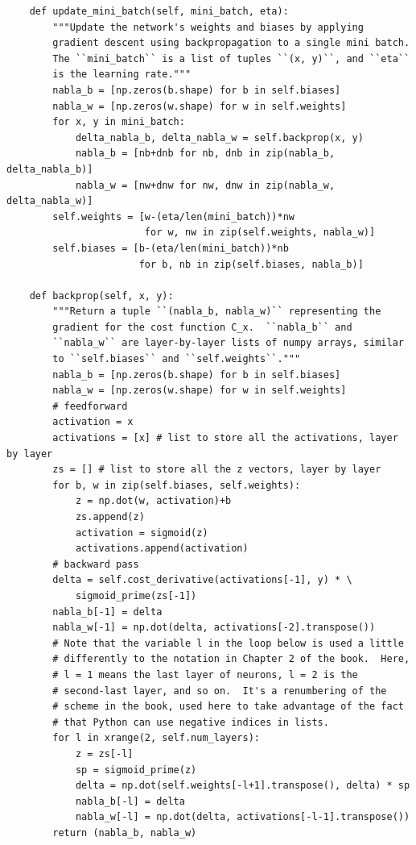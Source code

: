 \begin{verbatim}
    def update_mini_batch(self, mini_batch, eta):
        """Update the network's weights and biases by applying
        gradient descent using backpropagation to a single mini batch.
        The ``mini_batch`` is a list of tuples ``(x, y)``, and ``eta``
        is the learning rate."""
        nabla_b = [np.zeros(b.shape) for b in self.biases]
        nabla_w = [np.zeros(w.shape) for w in self.weights]
        for x, y in mini_batch:
            delta_nabla_b, delta_nabla_w = self.backprop(x, y)
            nabla_b = [nb+dnb for nb, dnb in zip(nabla_b, delta_nabla_b)]
            nabla_w = [nw+dnw for nw, dnw in zip(nabla_w, delta_nabla_w)]
        self.weights = [w-(eta/len(mini_batch))*nw
                        for w, nw in zip(self.weights, nabla_w)]
        self.biases = [b-(eta/len(mini_batch))*nb
                       for b, nb in zip(self.biases, nabla_b)]

    def backprop(self, x, y):
        """Return a tuple ``(nabla_b, nabla_w)`` representing the
        gradient for the cost function C_x.  ``nabla_b`` and
        ``nabla_w`` are layer-by-layer lists of numpy arrays, similar
        to ``self.biases`` and ``self.weights``."""
        nabla_b = [np.zeros(b.shape) for b in self.biases]
        nabla_w = [np.zeros(w.shape) for w in self.weights]
        # feedforward
        activation = x
        activations = [x] # list to store all the activations, layer by layer
        zs = [] # list to store all the z vectors, layer by layer
        for b, w in zip(self.biases, self.weights):
            z = np.dot(w, activation)+b
            zs.append(z)
            activation = sigmoid(z)
            activations.append(activation)
        # backward pass
        delta = self.cost_derivative(activations[-1], y) * \
            sigmoid_prime(zs[-1])
        nabla_b[-1] = delta
        nabla_w[-1] = np.dot(delta, activations[-2].transpose())
        # Note that the variable l in the loop below is used a little
        # differently to the notation in Chapter 2 of the book.  Here,
        # l = 1 means the last layer of neurons, l = 2 is the
        # second-last layer, and so on.  It's a renumbering of the
        # scheme in the book, used here to take advantage of the fact
        # that Python can use negative indices in lists.
        for l in xrange(2, self.num_layers):
            z = zs[-l]
            sp = sigmoid_prime(z)
            delta = np.dot(self.weights[-l+1].transpose(), delta) * sp
            nabla_b[-l] = delta
            nabla_w[-l] = np.dot(delta, activations[-l-1].transpose())
        return (nabla_b, nabla_w)


\end{verbatim}
